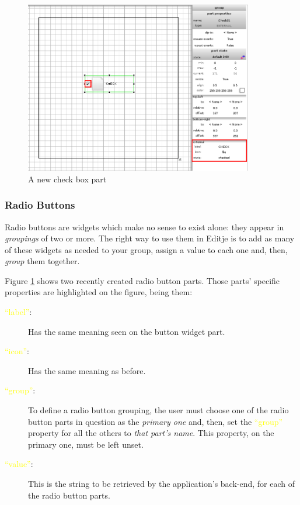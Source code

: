 \documentclass[a4paper]{profusion}
\newcommand{\GUIEditable}[1]{\textcolor{yellow}{#1}} %
\begin{document}
\begin{figure}[h!]
  \centering
  \includegraphics[width=0.89\textwidth]{images/new_checkbox.png}
  \caption{A new check box part}
  \label{fig:new_checkbox}
\end{figure}

\subsubsection{Radio Buttons}

Radio buttons are widgets which make no sense to exist alone: they
appear in \emph{groupings} of two or more. The right way to use them
in Editje is to add as many of these widgets as needed to your group,
assign a value to each one and, then, \emph{group} them together.

Figure \ref{fig:new_checkbox} shows two recently created radio button
parts. Those parts' specific properties are highlighted on the figure,
being them:

\begin{description}
  \item[\GUIEditable{``label''}:] Has the same meaning seen on the
    button widget part.
  \item[\GUIEditable{``icon''}:] Has the same meaning as before.
  \item[\GUIEditable{``group''}:] To define a radio button grouping,
    the user must choose one of the radio button parts in question as
    the \emph{primary one} and, then, set the \GUIEditable{``group''}
    property for all the others to \emph{that part's name}. This
    property, on the primary one, must be left unset.
  \item[\GUIEditable{``value''}:] This is the string to be retrieved
    by the application's back-end, for each of the radio button parts.
\end{description}
\end{document}
